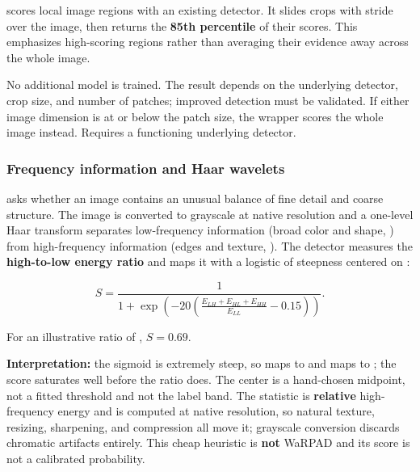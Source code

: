 \texttt{} scores local image regions with
an existing detector. It slides \texttt{} crops with
stride \texttt{} over the image, then returns the
\textbf{85th percentile} of their scores. This emphasizes high-scoring
regions rather than averaging their evidence away across the whole
image.

No additional model is trained. The result depends on the underlying
detector, crop size, and number of patches; improved detection must be
validated. If either image dimension is at or below the patch size, the
wrapper scores the whole image instead. Requires a functioning
underlying detector.

\subsubsection{Frequency information and Haar
wavelets}\label{record-DETECTORS-md-frequency-information-and-haar-wavelets}

\texttt{} asks whether an image contains an
unusual balance of fine detail and coarse structure. The image is
converted to grayscale at native resolution and a one-level Haar
transform separates low-frequency information (broad color and shape,
\texttt{}) from high-frequency information (edges and
texture, \texttt{}). The detector measures the
\textbf{high-to-low energy ratio} and maps it with a logistic of
steepness \texttt{} centered on \texttt{}:

\[
S = \frac{1}{1 + \exp\left(-20\left(\frac{E_{LH} + E_{HL} + E_{HH}}{E_{LL}} - 0.15\right)\right)}.
\]

For an illustrative ratio of \texttt{}, \(S = 0.69\).

\textbf{Interpretation:} the sigmoid is extremely steep, so
\texttt{} maps to \texttt{} and
\texttt{} maps to \texttt{}; the score
saturates well before the ratio does. The center
\texttt{} is a hand-chosen midpoint, not a fitted
threshold and not the \texttt{} label band. The statistic
is \textbf{relative} high-frequency energy and is computed at native
resolution, so natural texture, resizing, sharpening, and compression
all move it; grayscale conversion discards chromatic artifacts entirely.
This cheap heuristic is \textbf{not} WaRPAD and its score is not a
calibrated probability.


